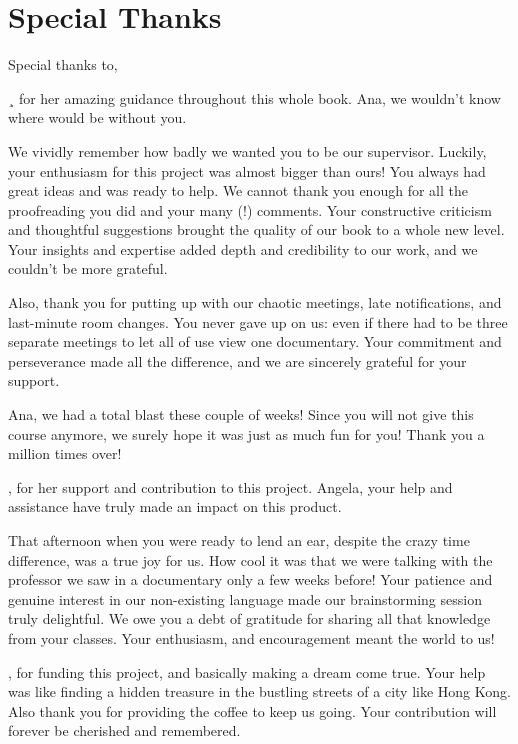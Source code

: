 \section{Special Thanks}

Special thanks to, 

¸ for her amazing guidance throughout this whole book. Ana, we wouldn’t know where would be without you. 

We vividly remember how badly we wanted you to be our supervisor. Luckily, your enthusiasm for this project was almost bigger than ours! You always had great ideas and was ready to help. We cannot thank you enough for all the proofreading you did and your many (!) comments. Your constructive criticism and thoughtful suggestions brought the quality of our book to a whole new level. Your insights and expertise added depth and credibility to our work, and we couldn’t be more grateful.  

Also, thank you for putting up with our chaotic meetings, late notifications, and last-minute room changes. You never gave up on us: even if there had to be three separate meetings to let all of use view one documentary. Your commitment and perseverance made all the difference, and we are sincerely grateful for your support. 

Ana, we had a total blast these couple of weeks! Since you will not give this course anymore, we surely hope it was just as much fun for you! Thank you a million times over! 

  

, for her support and contribution to this project. Angela, your help and assistance have truly made an impact on this product.  

That afternoon when you were ready to lend an ear, despite the crazy time difference, was a true joy for us. How cool it was that we were talking with the professor we saw in a documentary only a few weeks before! Your patience and genuine interest in our non-existing language made our brainstorming session truly delightful. We owe you a debt of gratitude for sharing all that knowledge from your classes. Your enthusiasm, and encouragement meant the world to us! 

 

, for funding this project,  and basically making a dream come true. Your help was like finding a hidden treasure in the bustling streets of a city like Hong Kong. Also thank you for providing the coffee to keep us going. Your contribution will forever be cherished and remembered.

